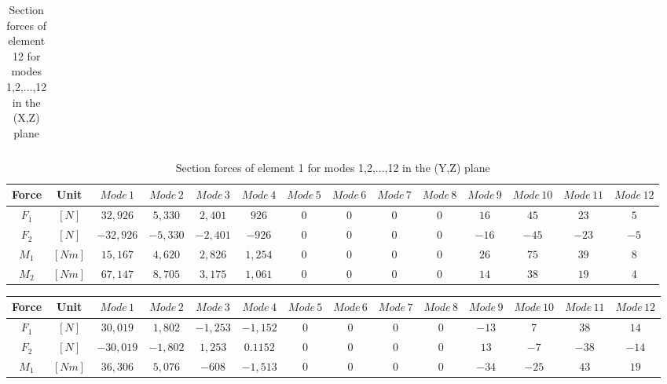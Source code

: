 \documentclass[11pt,a4paper,titlepage]{report}
\begin{document}
\begin{appendix}
\begin{landscape}
\begin{table}[]
\begin{tiny}
\begin{tabular}{c|c|c|c|c|c|c|c|c|c|c|c|c|c}
        \end{tabular}
        \end{tiny}
    \caption{Section forces of element 12 for modes 1,2,...,12 in the (X,Z) plane}
    \label{tab:my_label}
\end{table}
\begin{table}[]
    \centering
    \begin{tiny}
    \begin{tabular}{c|c|c|c|c|c|c|c|c|c|c|c|c|c}
    Force & Unit & $Mode\,1$ & $Mode\,2$ & $Mode\,3$ & $Mode\,4$ & $Mode\,5$ & $Mode\,6$ & $Mode\,7$ & $Mode\,8$ & $Mode\,9$ & $Mode\,10$ & $Mode\,11$ & $Mode\,12$\\
    \hline
      $F_1$ & $[N]$ & $32,926$  &  $5,330$ &   $2,401$ &   $926$  &  $0$  & $0$ &   $0$ &  $0$ & $16$ & $45$ & $23$  &  $5$ \\
       $F_2$ & $[N]$ & $-32,926$  & $-5,330$ &  $-2,401$ &  $-926$ &  $0$  &  $0$ &  $0$ &   $0$ &  $-16$ &  $-45$ &  $-23$ &  $-5$\\
       $M_1$ & $[Nm]$ & $15,167$  &  $4,620$  & $2,826$  & $1,254$  &  $0$ &  $0$  &  $0$ &  $0$  & $26$  &  $75$  &  $39$  &  $8$\\
        $M_2$ & $[Nm]$ & $67,147$  &  $8,705$  &  $3,175$  &  $1,061$  &  $0$ &  $0$  &  $0$ &  $0$  &  $14$  &  $38$  &  $19$  &  $4$\\
        \end{tabular}
        \end{tiny}
    \caption{Section forces of element 1 for modes 1,2,...,12 in the (Y,Z) plane}
    \label{tab:my_label}
\end{table}
\begin{table}[]
    \centering
    \begin{tiny}
    \begin{tabular}{c|c|c|c|c|c|c|c|c|c|c|c|c|c}
    Force & Unit & $Mode\,1$ & $Mode\,2$ & $Mode\,3$ & $Mode\,4$ & $Mode\,5$ & $Mode\,6$ & $Mode\,7$ & $Mode\,8$ & $Mode\,9$ & $Mode\,10$ & $Mode\,11$ & $Mode\,12$\\
    \hline
        $F_1$ & $[N]$ & $30,019$  &  $1,802$  & $-1,253$  & $-1,152$ &  $0$ &  $0$ & $0$ &   $0$  & $-13$ & $7$  &  $38$  &  $14$\\
        $F_2$ & $[N]$ &  $-30,019$  & $-1,802$  &  $1,253$ &   $0.1152$  &  $0$ &   $0$ &  $0$  & $0$  &  $13$ & $-7$  & $-38$  & $-14$\\
        $M_1$ & $[Nm]$ & $36,306$  &  $5,076$ &  $-608$  & $-1,513$  & $0$  & $0$    & $0$  & $0$  & $-34$ & $-25$  &  $43$  &  $19$\\

\end{tabular}
\end{tiny}
\end{table}
\end{landscape}
\end{appendix}
\end{document}
